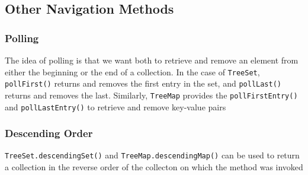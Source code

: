 \subsection{Other Navigation Methods}
\subsubsection{Polling}
The idea of polling is that we want both to retrieve and remove an element from 
either the beginning or the end of a collection. In the case of \verb#TreeSet#, 
\verb#pollFirst()# returns and removes the first entry in the set, and 
\verb#pollLast()# returns and removes the last. Similarly, \verb#TreeMap# 
provides the \verb#pollFirstEntry()# and \verb#pollLastEntry()# to retrieve and 
remove key-value pairs

\subsubsection{Descending Order}
\verb#TreeSet.descendingSet()# and \verb#TreeMap.descendingMap()# can be used 
to return a collection in the reverse order of the collecton on which the 
method was invoked

